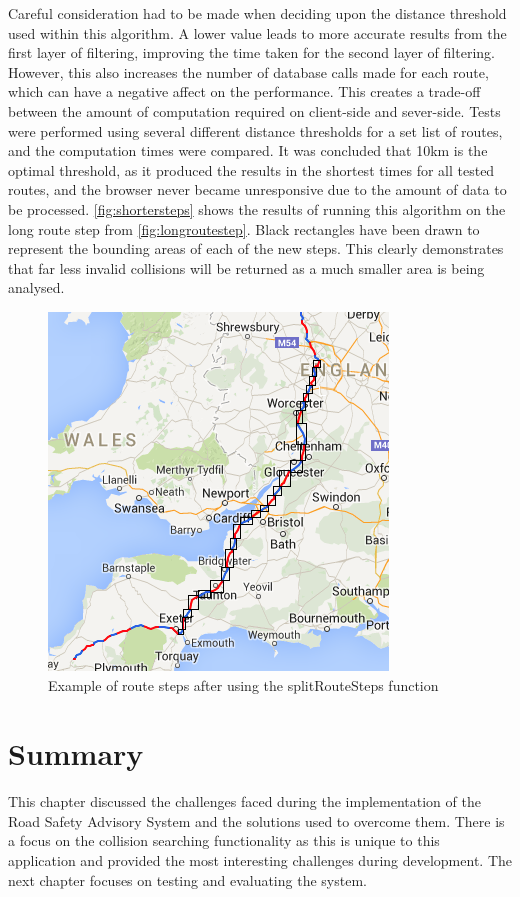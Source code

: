 \documentclass[authoryearcitations]{UoYCSproject}
\begin{document}
Careful consideration had to be made when deciding upon the distance threshold used within this algorithm. A lower value leads to more accurate results from the first layer of filtering, improving the time taken for the second layer of filtering. However, this also increases the number of database calls made for each route, which can have a negative affect on the performance. This creates a trade-off between the amount of computation required on client-side and sever-side. Tests were performed using several different distance thresholds for a set list of routes, and the computation times were compared. It was concluded that 10km is the optimal threshold, as it produced the results in the shortest times for all tested routes, and the browser never became unresponsive due to the amount of data to be processed. \autoref{fig:shortersteps} shows the results of running this algorithm on the long route step from \autoref{fig:longroutestep}. Black rectangles have been drawn to represent the bounding areas of each of the new steps. This clearly demonstrates that far less invalid collisions will be returned as a much smaller area is being analysed.

\begin{figure}
	\center
	\includegraphics[scale=0.7]{shortersteps}
	\caption{Example of route steps after using the splitRouteSteps function}
	\label{fig:shortersteps}
\end{figure}


\section{Summary}
This chapter discussed the challenges faced during the implementation of the Road Safety Advisory System and the solutions used to overcome them. There is a focus on the collision searching functionality as this is unique to this application and provided the most interesting challenges during development. The next chapter focuses on testing and evaluating the system.
\end{document}
